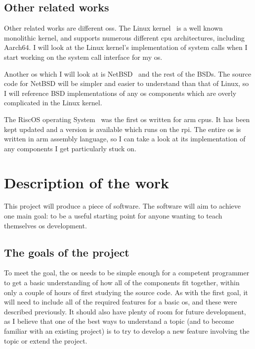 \documentclass{article}
\begin{document}
\begin{refsection}
\subsection{Other related works}

Other related works are different \glspl{os}. The Linux
kernel~\cite{linux-kernel-git} is a well known monolithic kernel, and supports
numerous different \gls{cpu} architectures, including Aarch64. I will look at
the Linux kernel's implementation of system calls when I start working on the
system call interface for my \gls{os}.

Another \gls{os} which I will look at is NetBSD~\cite{netBSD-git} and the rest
of the BSDs. The source code for NetBSD will be simpler and easier to
understand than that of Linux, so I will reference BSD implementations of any
\gls{os} components which are overly complicated in the Linux kernel.

The RiscOS operating System~\cite{riscOS-source} was the first \gls{os} written
for \gls{arm} \glspl{cpu}. It has been kept updated and a version is available
which runs on the \gls{rpi}. The entire \gls{os} is written in \gls{arm}
assembly language, so I can take a look at its implementation of any components
I get particularly stuck on.

\printbibliography[heading=relworks]

\end{refsection}

\section{Description of the work}
This project will produce a piece of software. The software will aim to achieve
one main goal: to be a useful starting point for anyone
wanting to teach themselves \gls{os} development.

\subsection{The goals of the project}
To meet the goal, the \gls{os} needs to be simple enough for a competent
programmer to get a basic understanding of how all of the components fit
together, within only a couple of hours of first studying the source code. As
with the first goal, it will need to include all of the required features for a
basic \gls{os}, and these were described previously. It should also have plenty
of room for future development, as I believe that one of the best ways to
understand a topic (and to become familiar with an existing project) is to try
to develop a new feature involving the topic or extend the project.
\end{document}
